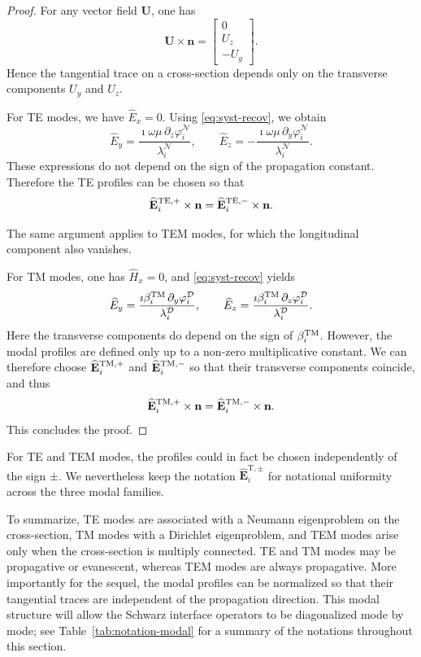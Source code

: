 \documentclass[smallextended]{svjour3}       %
\newcommand{\bfE}{{\mathbf{E}}}
\newcommand{\bfU}{\mathbf U}
\begin{document}
\begin{proof}
For any vector field $\bfU$, one has
\begin{equation}\label{eq:cross-prod}
\bfU\times \mathbf n=
\begin{bmatrix}
0\\ U_z\\ -U_y
\end{bmatrix}.
\end{equation}
Hence the tangential trace on a cross-section depends only on the transverse components $U_y$ and $U_z$.

For TE modes, we have $\widehat E_x=0$. Using \eqref{eq:syst-recov}, we obtain
\[
\widehat E_y=\frac{\imath\omega\mu\,\partial_z\varphi_i^{\mathcal N}}{\lambda_i^{\mathcal N}},
\qquad
\widehat E_z=-\frac{\imath\omega\mu\,\partial_y\varphi_i^{\mathcal N}}{\lambda_i^{\mathcal N}}.
\]
These expressions do not depend on the sign of the propagation constant. Therefore the TE profiles can be chosen so that
\[
\widehat{\bfE}^{\rm TE,+}_i\times \mathbf n
=
\widehat{\bfE}^{\rm TE,-}_i\times \mathbf n.
\]

The same argument applies to TEM modes, for which the longitudinal component also vanishes.

For TM modes, one has $\widehat H_x=0$, and \eqref{eq:syst-recov} yields
\[
\widehat E_y=\frac{\imath \beta_i^{\rm TM}\,\partial_y\varphi_i^{\mathcal D}}{\lambda_i^{\mathcal D}},
\qquad
\widehat E_z=\frac{\imath \beta_i^{\rm TM}\,\partial_z\varphi_i^{\mathcal D}}{\lambda_i^{\mathcal D}}.
\]
Here the transverse components do depend on the sign of $\beta_i^{\rm TM}$. However, the modal profiles are defined only up to a non-zero multiplicative constant. We can therefore choose $\widehat{\bfE}^{\rm TM,+}_i$ and $\widehat{\bfE}^{\rm TM,-}_i$ so that their transverse components coincide, and thus
\[
\widehat{\bfE}^{\rm TM,+}_i\times \mathbf n
=
\widehat{\bfE}^{\rm TM,-}_i\times \mathbf n.
\]
This concludes the proof.
\end{proof}

\begin{remark}
For TE and TEM modes, the profiles could in fact be chosen independently of the sign $\pm$. We nevertheless keep the notation $\widehat{\bfE}^{\mathrm T,\pm}_i$ for notational uniformity across the three modal families.
\end{remark}

To summarize, TE modes are associated with a Neumann eigenproblem on the cross-section, TM modes with a Dirichlet eigenproblem, and TEM modes arise only when the cross-section is multiply connected. TE and TM modes may be propagative or evanescent, whereas TEM modes are always propagative. More importantly for the sequel, the modal profiles can be normalized so that their tangential traces are independent of the propagation direction. This modal structure will allow the Schwarz interface operators to be diagonalized mode by mode; see Table~\ref{tab:notation-modal} for a summary of the notations throughout this section.
\end{document}
